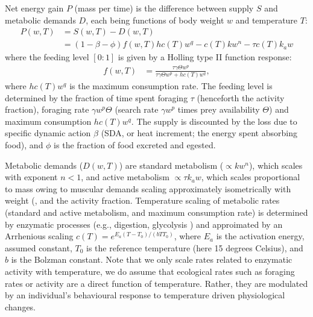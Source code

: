 \documentclass[11pt]{article}\usepackage[]{graphicx}\usepackage[]{color}
\begin{document}
Net energy gain $P$ (mass per time) is the difference between supply $S$ and metabolic demands $D$, each being functions of body weight $w$ and temperature $T$:
\begin{align}
P(w,T) &= S(w,T) - D(w,T) \\
          &=(1-\beta-\phi)f(w,T) h c(T) w^q  - c(T) k w^n - \tau c(T) k_a w
  \label{eq:P}
\end{align}
where the feeding level $[0:1]$ is given by a Holling type II function response:
\begin{align}
  f(w,T) &= \frac{\tau \gamma\Theta w^{p} }{\tau \gamma\Theta w^{p} + h c(T) w^q}, \label{eq:f} 
\end{align}
where $h c(T) w^q$ is the maximum consumption rate. The feeding level is determined by the fraction of time spent foraging $\tau$ (henceforth the activity fraction), foraging rate $\gamma w^p \Theta$ (search rate $\gamma w^p$ times prey availability $\Theta$) and maximum consumption $h c(T) w^q$.  The supply is discounted by the loss due to specific dynamic action  $\beta$ (SDA, or heat increment; the energy spent absorbing food), and $\phi$ is the fraction of food excreted and egested. 

Metabolic demands ($D(w,T)$) are standard metabolism ($\propto k w^n$), which scales with exponent $n<1$, and active metabolism $\propto \tau k_a w$, which scales proportional to mass owing to muscular demands scaling approximately isometrically with weight (\cite{glazier_activity_2009,brett1965relation}, and the activity fraction. Temperature scaling of metabolic rates (standard and active metabolism, and maximum consumption rate) is determined by enzymatic processes (e.g., digestion, glycolysis \cite{jeschke_predator_2002, sentis_parsing_2013}) and approimated by an Arrhenious scaling $c(T) = e^{E_a(T-T_0)/(bTT_0)}$, where $E_a$ is the activation energy, assumed constant, $T_0$ is the reference temperature (here 15 degrees Celsius), and $b$ is the Bolzman constant. Note that we only scale rates related to enzymatic activity with temperature, we do assume that ecological rates such as foraging rates or activity are a direct function of temperature. Rather, they are modulated by an individual's behavioural response to temperature driven physiological changes.
\end{document}
